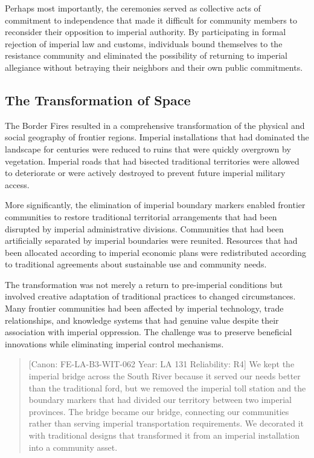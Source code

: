 Perhaps most importantly, the ceremonies served as collective acts of
commitment to independence that made it difficult for community members
to reconsider their opposition to imperial authority. By participating
in formal rejection of imperial law and customs, individuals bound
themselves to the resistance community and eliminated the possibility of
returning to imperial allegiance without betraying their neighbors and
their own public commitments.

\subsection{The Transformation of
Space}\label{the-transformation-of-space}

The Border Fires resulted in a comprehensive transformation of the
physical and social geography of frontier regions. Imperial
installations that had dominated the landscape for centuries were
reduced to ruins that were quickly overgrown by vegetation. Imperial
roads that had bisected traditional territories were allowed to
deteriorate or were actively destroyed to prevent future imperial
military access.

More significantly, the elimination of imperial boundary markers enabled
frontier communities to restore traditional territorial arrangements
that had been disrupted by imperial administrative divisions.
Communities that had been artificially separated by imperial boundaries
were reunited. Resources that had been allocated according to imperial
economic plans were redistributed according to traditional agreements
about sustainable use and community needs.

The transformation was not merely a return to pre-imperial conditions
but involved creative adaptation of traditional practices to changed
circumstances. Many frontier communities had been affected by imperial
technology, trade relationships, and knowledge systems that had genuine
value despite their association with imperial oppression. The challenge
was to preserve beneficial innovations while eliminating imperial
control mechanisms.

\begin{quote}
{[}Canon: FE-LA-B3-WIT-062 \textbar{} Year: LA 131 \textbar{}
Reliability: R4{]} We kept the imperial bridge across the South River
because it served our needs better than the traditional ford, but we
removed the imperial toll station and the boundary markers that had
divided our territory between two imperial provinces. The bridge became
our bridge, connecting our communities rather than serving imperial
transportation requirements. We decorated it with traditional designs
that transformed it from an imperial installation into a community
asset.
\end{quote}

